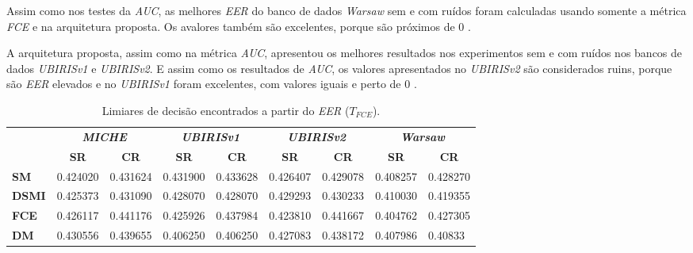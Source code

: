 \par Assim como nos testes da \textit{\acrshort{AUC}}, as melhores \textit{\acrshort{EER}} do banco de dados \textit{\acrshort{Warsaw}} sem e com ruídos foram calculadas usando somente a métrica \textit{\acrshort{FCE}} e na arquitetura proposta. Os avalores também são excelentes, porque são próximos de 0 \cite{eer, d33BEAT}.

\par A arquitetura proposta, assim como na métrica \textit{\acrshort{AUC}}, apresentou os melhores resultados nos experimentos sem e com ruídos nos bancos de dados \textit{UBIRISv1} e \textit{UBIRISv2}. E assim como os resultados de \textit{\acrshort{AUC}}, os valores apresentados no \textit{UBIRISv2} são considerados ruins, porque são \textit{\acrshort{EER}} elevados e no \textit{UBIRISv1} foram excelentes, com valores iguais e perto de 0 \cite{eer, d33BEAT}.

\begin{table}[h!]
\centering
\caption{Limiares de decisão encontrados a partir do \textit{\acrshort{EER}} ($T_{FCE}$).}
\label{tab:experimentos:limiar_eer}
\tabcolsep=0.09cm
\begin{tabular}{l|l|l|l|l|l|l|l|l|}
\cline{2-9}
 & \multicolumn{2}{c|}{\textit{\textbf{MICHE}}} & \multicolumn{2}{c|}{\textit{\textbf{UBIRISv1}}} & \multicolumn{2}{c|}{\textit{\textbf{UBIRISv2}}} & \multicolumn{2}{c|}{\textit{\textbf{Warsaw}}} \\ \cline{2-9} 
 & \multicolumn{1}{c|}{\textbf{SR}} & \multicolumn{1}{c|}{\textbf{CR}} & \multicolumn{1}{c|}{\textbf{SR}} & \multicolumn{1}{c|}{\textbf{CR}} & \multicolumn{1}{c|}{\textbf{SR}} & \multicolumn{1}{c|}{\textbf{CR}} & \multicolumn{1}{c|}{\textbf{SR}} & \multicolumn{1}{c|}{\textbf{CR}} \\ \hline
\multicolumn{1}{|l|}{\textbf{SM}} & 0.424020 & 0.431624 & 0.431900 & 0.433628 & 0.426407 & 0.429078 & 0.408257 & 0.428270 \\ \hline
\multicolumn{1}{|l|}{\textbf{DSMI}} & 0.425373 & 0.431090 & 0.428070 & 0.428070 & 0.429293 & 0.430233 & 0.410030 & 0.419355 \\ \hline
\multicolumn{1}{|l|}{\textbf{FCE}} & 0.426117 & 0.441176 & 0.425926 & 0.437984 & 0.423810 & 0.441667 & 0.404762 & 0.427305 \\ \hline
\multicolumn{1}{|l|}{\textbf{DM}} & 0.430556 & 0.439655 & 0.406250 & 0.406250 & 0.427083 & 0.438172 & 0.407986 & 0.40833 \\ \hline
\end{tabular}
\end{table}

